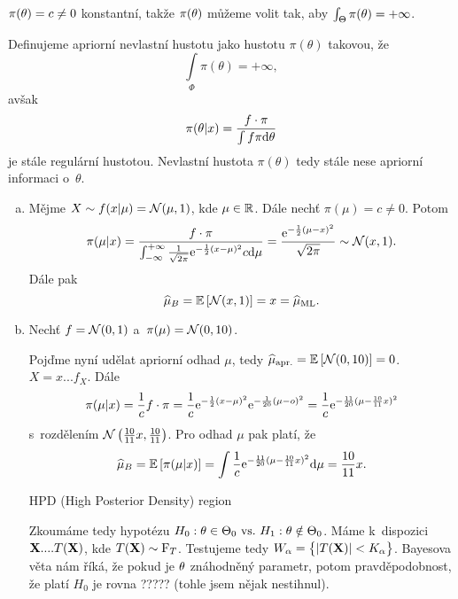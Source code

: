 

$\pi(\theta)=c\neq0$ konstantní, takže $\pi(\theta)$ můžeme volit tak, aby $\int_\Theta\pi(\theta)=+\infty$.
\begin{define} Definujeme apriorní nevlastní hustotu jako hustotu $\pi(\theta)$ takovou, že $$ \int\limits_{\Phi}{\pi(\theta)} = +\infty,$$  avšak 
	$$\pi(\theta|x)=\frac{f\cdot \pi}{\int f\pi\mathrm{d}\theta}$$ je stále regulární hustotou. Nevlastní hustota $\pi(\theta)$ tedy stále nese apriorní informaci o~$\theta$.
\end{define}
\begin{example}\begin{enumerate}[a)]
		\item 
	Mějme $X\sim f(x|\mu)=\mathcal{N}(\mu,1)$, kde $\mu\in\mathbb{R}$. Dále nechť $\pi(\mu)=c\neq0$. Potom$$ \pi(\mu|x)=\frac{f\cdot \pi}{\int_{-\infty}^{+\infty}\frac{1}{\sqrt{2\pi}}\mathrm{e}^{-\frac{1}{2}(x-\mu)^2}c\mathrm{d}\mu}=\frac{\mathrm{e}^{-\frac{1}{2}(\mu-x)^2}}{\sqrt{2\pi}}\sim\mathcal{N}(x,1).$$
	Dále pak 
	$$\widehat{\mu}_B=\mathbb{E}\left[ \mathcal{N}(x,1) \right]=x=\widehat{\mu}_{\mathrm{ML}}.$$
	\item Nechť $f=\mathcal{N}(0,1)$ a~$\pi(\mu)=\mathcal{N}(0,10)$.
	
	
	
	Pojďme nyní udělat apriorní odhad $\mu$, tedy $\widehat{\mu}_{\mathrm{apr.}}=\mathbb{E}\left[ \mathcal{N}(0,10) \right]=0$. $X=x...f_X$. Dále
	$$ \pi(\mu|x)=\frac{1}{c}f\cdot\pi=\frac{1}{c}\mathrm{e}^{-\frac{1}{2}(x-\mu)^2}\mathrm{e}^{-\frac{1}{20}(\mu-o)^2}=\frac{1}{c}\mathrm{e}^{-\frac{11}{20}(\mu-\frac{10}{11}x)^2}$$ s~rozdělením $\mathcal{N}\left(\frac{10}{11}x,\frac{10}{11}\right)$.
	Pro odhad $\mu$ pak platí, že
	$$\widehat{\mu}_B=\mathbb{E}\left[ \pi(\mu|x) \right]=\int\frac{1}{c}\mathrm{e}^{-\frac{11}{20}(\mu-\frac{10}{11}x)^2}\mathrm{d}\mu=\frac{10}{11}x.$$ 
	
	HPD (High Posterior Density) region
	
	
	
	Zkoumáme tedy hypotézu $H_0: \theta\in\Theta_0 ~\text{vs.}~ H_1: \theta\notin\Theta_0$. Máme k~dispozici $\textbf{X}....T(\textbf{X})$, kde $T(\textbf{X})\sim\mathrm{F}_T$. Testujeme tedy $W_\alpha=\big\{ |T(\textbf{X})|<K_\alpha \big\}$. Bayesova věta nám říká, že pokud je $\theta$ znáhodněný parametr, potom pravděpodobnost, že platí $H_0$ je rovna ????? (tohle jsem nějak nestihnul).
	\end{enumerate}
\end{example}
